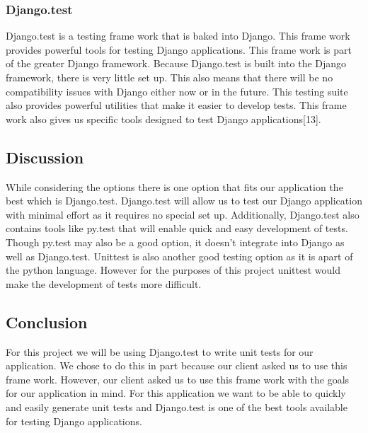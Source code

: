 \documentclass[onecolumn, draftclsnofoot,10pt, compsoc]{article}
\begin{document}
		\subsubsection{Django.test}
			Django.test is a testing frame work that is baked into Django. This frame work provides powerful tools for testing Django applications. This frame work is part of the greater Django framework. Because Django.test is built into the Django framework, there is very little set up. This also means that there will be no compatibility issues with Django either now or in the future. This testing suite also provides powerful utilities that make it easier to develop tests. This frame work also gives us specific tools designed to test Django applications[13].
	\subsection{Discussion}
		While considering the options there is one option that fits our application the best which is Django.test. Django.test will allow us to test our Django application with minimal effort as it requires no special set up. Additionally, Django.test also contains tools like py.test that will enable quick and easy development of tests. Though py.test may also be a good option, it doesn't integrate into Django as well as Django.test. Unittest is also another good testing option as it is apart of the python language. However for the purposes of this project unittest would make the development of tests more difficult. 
	\subsection{Conclusion}
		For this project we will be using Django.test to write unit tests for our application. We chose to do this in part because our client asked us to use this frame work. However, our client asked us to use this frame work with the goals for our application in mind. For this application we want to be able to quickly and easily generate unit tests and Django.test is one of the best tools available for testing Django applications.
\end{document}

